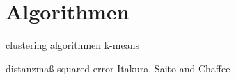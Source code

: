 \section{Algorithmen}
\label{sect:algorithmen}

clustering algorithmen
	k-means
	
distanzmaß
	squared error
	Itakura, Saito and Chaffee